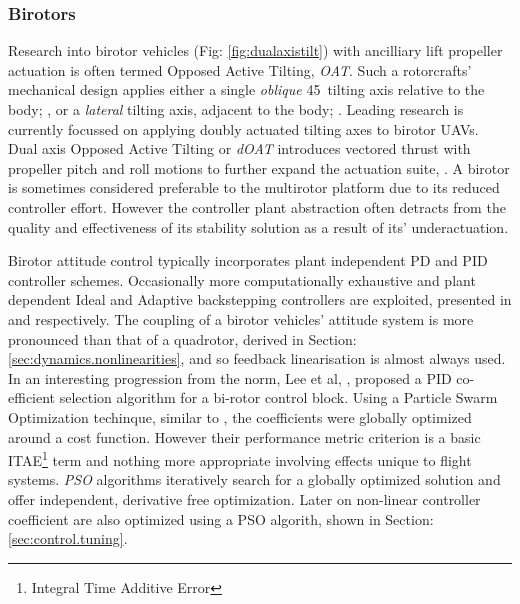 \subsubsection*{Birotors}
Research into birotor vehicles (Fig: \ref{fig:dualaxistilt}) with ancilliary lift propeller actuation is often termed Opposed Active Tilting, \emph{OAT}. Such a rotorcrafts' mechanical design applies either a single \emph{oblique} 45\textdegree ~tilting axis relative to the body; \cite{smalltwotilting,obliquepitch,passiveobliquetilting}, or a \emph{lateral} tilting axis, adjacent to the body; \cite{tiltrotorUAV,adaptivebackstep,tiltrotorcontrol,tpheonix}. Leading research is currently focussed on applying doubly actuated tilting axes to birotor UAVs. Dual axis Opposed Active Tilting or \emph{dOAT} introduces vectored thrust with propeller pitch and roll motions to further expand the actuation suite, \cite{gres2007,opposedlateraldualaxis}. A birotor is sometimes considered preferable to the multirotor platform due to its reduced controller effort. However the controller plant abstraction often detracts from the quality and effectiveness of its stability solution as a result of its' underactuation. 
\par
Birotor attitude control typically incorporates plant independent PD \cite{obliquepitch} and PID \cite{tiltrotorUAV} controller schemes. Occasionally more computationally exhaustive and plant dependent Ideal and Adaptive backstepping controllers are exploited, presented in \cite{smalltwotilting,tpheonix} and \cite{adaptivebackstep} respectively. The coupling of a birotor vehicles' attitude system is more pronounced than that of a quadrotor, derived in Section: \ref{sec:dynamics.nonlinearities}, and so feedback linearisation is almost always used. In an interesting progression from the norm, Lee et al,  \cite{autopilotPSO}, proposed a PID co-efficient selection algorithm for a bi-rotor control block. Using a Particle Swarm Optimization techinque, similar to \cite{adaptivepso}, the coefficients were globally optimized around a cost function. However their performance metric criterion is a basic ITAE\footnote{Integral Time Additive Error} term and nothing more appropriate involving effects unique to flight systems. \emph{PSO} algorithms iteratively search for a globally optimized solution and offer independent, derivative free optimization. Later on non-linear controller coefficient are also optimized using a PSO algorith, shown in Section:\ref{sec:control.tuning}.
\par
